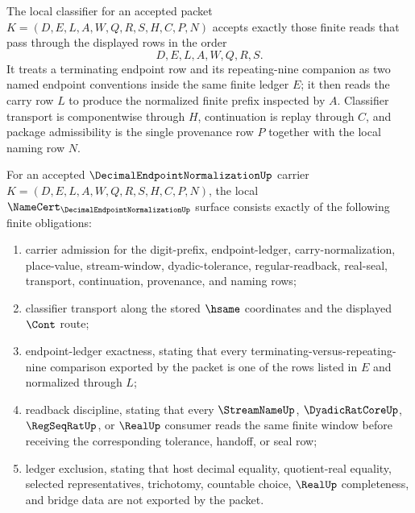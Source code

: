 \begin{definition}\label{def:decimal-endpoint-normalization-classifier}
The local classifier for an accepted packet $K=(D,E,L,A,W,Q,R,S,H,C,P,N)$ accepts exactly those finite reads that pass through the displayed rows in the order
$$
D,E,L,A,W,Q,R,S .
$$
It treats a terminating endpoint row and its repeating-nine companion as two named endpoint conventions inside the same finite ledger $E$; it then reads the carry row $L$ to produce the normalized finite prefix inspected by $A$. Classifier transport is componentwise through $H$, continuation is replay through $C$, and package admissibility is the single provenance row $P$ together with the local naming row $N$.
\end{definition}

\begin{theorem}\label{thm:decimal-endpoint-normalization-namecert-obligations}
For an accepted $\DecimalEndpointNormalizationUp$ carrier $K=(D,E,L,A,W,Q,R,S,H,C,P,N)$, the local $\NameCert_{\DecimalEndpointNormalizationUp}$ surface consists exactly of the following finite obligations:
\begin{enumerate}
\item carrier admission for the digit-prefix, endpoint-ledger, carry-normalization, place-value, stream-window, dyadic-tolerance, regular-readback, real-seal, transport, continuation, provenance, and naming rows;
\item classifier transport along the stored $\hsame$ coordinates and the displayed $\Cont$ route;
\item endpoint-ledger exactness, stating that every terminating-versus-repeating-nine comparison exported by the packet is one of the rows listed in $E$ and normalized through $L$;
\item readback discipline, stating that every $\StreamNameUp$, $\DyadicRatCoreUp$, $\RegSeqRatUp$, or $\RealUp$ consumer reads the same finite window before receiving the corresponding tolerance, handoff, or seal row;
\item ledger exclusion, stating that host decimal equality, quotient-real equality, selected representatives, trichotomy, countable choice, $\RealUp$ completeness, and bridge data are not exported by the packet.
\end{enumerate}
\end{theorem}
